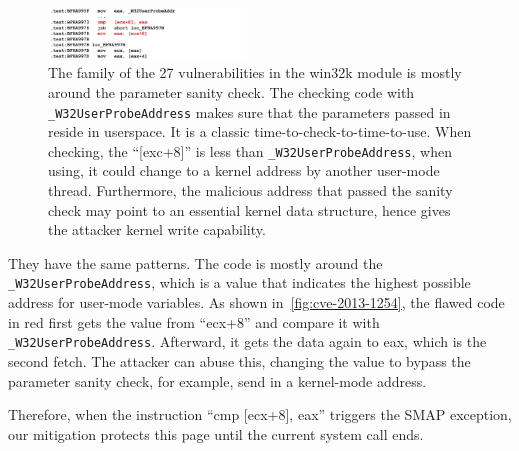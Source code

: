\begin{figure}[th]
  \includegraphics[width=0.47\textwidth]{figures/cve-2013-1254}
  \centering
  \caption{The family of the 27 vulnerabilities in the win32k module is mostly around the parameter sanity check. The checking code with \texttt{\_W32UserProbeAddress} makes sure that the parameters passed in reside in userspace. It is a classic time-to-check-to-time-to-use. When checking, the ``[exc+8]'' is less than \texttt{\_W32UserProbeAddress}, when using, it could change to a kernel address by another user-mode thread. Furthermore, the malicious address that passed the sanity check may point to an essential kernel data structure, hence gives the attacker kernel write capability.}
  \label{fig:cve-2013-1254}
\end{figure}




They have the same patterns. The code is mostly around the \texttt{\_W32UserProbeAddress}, which is a value that indicates the highest possible address for user-mode variables. As shown in~\autoref{fig:cve-2013-1254}, the flawed code in red first gets the value from ``ecx+8'' and compare it with \texttt{\_W32UserProbeAddress}. Afterward, it gets the data again to eax, which is the second fetch. The attacker can abuse this, changing the value to bypass the parameter sanity check, for example, send in a kernel-mode address. 


Therefore, when the instruction ``cmp [ecx+8], eax'' triggers the SMAP exception, our mitigation protects this page until the current system call ends.
